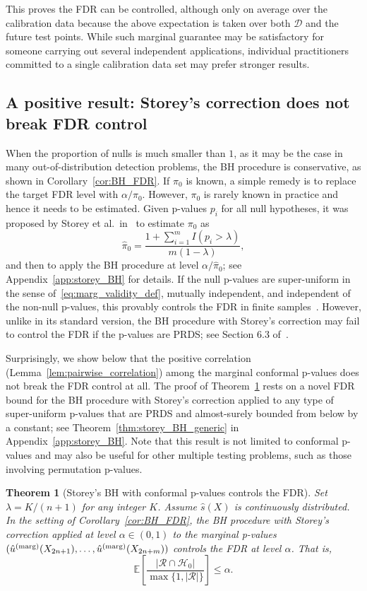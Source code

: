 \documentclass[11pt]{article}
\newtheorem{thm}{Theorem}
\def\E{\mathbb{E}}
\def\marg{\textnormal{(marg)}}
\begin{document}
This proves the FDR can be controlled, although only on average over the calibration data because the above expectation is taken over both $\mathcal{D}$ and the future test points.
While such marginal guarantee may be satisfactory for someone carrying out several independent applications, individual practitioners committed to a single calibration data set may prefer stronger results. 

\subsection{A positive result: Storey's correction does not break FDR control}
When the proportion of nulls is much smaller than $1$, as it may be the case in many out-of-distribution detection problems, the BH procedure is conservative, as shown in Corollary~\ref{cor:BH_FDR}. If $\pi_0$ is known, a simple remedy is to replace the target FDR level with $\alpha / \pi_0$. However, $\pi_0$ is rarely known in practice and hence it needs to be estimated. Given p-values $p_i$ for all null hypotheses, it was proposed by Storey et al.~in~\cite{storey2002direct,storey2004strong} to estimate $\pi_0$ as
\[\hat{\pi}_0 = \frac{1 + \sum_{i=1}^{m}I(p_i > \lambda)}{m(1 - \lambda)},\]
and then to apply the BH procedure at level $\alpha / \hat{\pi}_0$; see Appendix~\ref{app:storey_BH} for details.
If the null p-values are super-uniform {in the sense of~\eqref{eq:marg_validity_def}}, mutually independent, and independent of the non-null
p-values, this provably controls the FDR in finite samples~\cite{storey2004strong}.
However, unlike in its standard version, the BH procedure with Storey's correction may fail to control the FDR if the p-values are PRDS; see Section 6.3 of~\cite{benjamini2006adaptive}.

Surprisingly, we show below that the positive correlation (Lemma~\ref{lem:pairwise_correlation}) among the marginal conformal p-values does not break the FDR control at all. The proof of Theorem~\ref{thm:storey_BH} rests on a novel FDR bound for the BH procedure with Storey's correction applied to any type of super-uniform p-values that are PRDS and almost-surely bounded from below by a constant; see Theorem~\ref{thm:storey_BH_generic} in Appendix~\ref{app:storey_BH}. Note that this result is not limited to conformal p-values and may also be useful for other multiple testing problems, such as those involving permutation p-values.

\begin{thm}[Storey's BH with conformal p-values controls the FDR]\label{thm:storey_BH}
Set $\lambda = K / (n+1)$ for any integer $K$. Assume $\hat{s}(X)$ is continuously distributed. In the setting of Corollary~\ref{cor:BH_FDR}, the BH procedure with Storey's correction applied at level $\alpha \in (0,1)$ to the marginal p-values $(\hat{u}^\marg(X_{2n+1}),\dots,\hat{u}^\marg(X_{2n+m}))$ controls the FDR at level $\alpha$. That is,
\begin{equation}
    \E\left[\frac{|\mathcal{R} \cap \mathcal{H}_0|}{\max\{1, |\mathcal{R}|\} } \right] \le \alpha.
\end{equation}
\end{thm}
\end{document}
